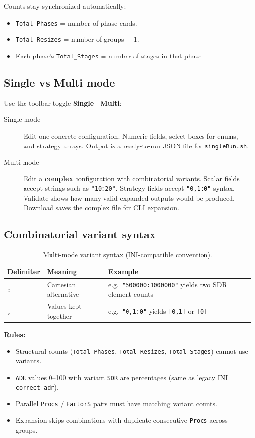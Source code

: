 Counts stay synchronized automatically:
\begin{itemize}
  \item \texttt{Total\_Phases} = number of phase cards.
  \item \texttt{Total\_Resizes} = number of groups $-$ 1.
  \item Each phase's \texttt{Total\_Stages} = number of stages in that phase.
\end{itemize}

\subsection{Single vs Multi mode}

Use the toolbar toggle \textbf{Single} | \textbf{Multi}:

\begin{description}
  \item[Single mode] Edit one concrete configuration. Numeric fields, select boxes for enums, and strategy arrays. Output is a ready-to-run JSON file for \texttt{singleRun.sh}.
  \item[Multi mode] Edit a \textbf{complex} configuration with combinatorial variants. Scalar fields accept strings such as \texttt{"10:20"}. Strategy fields accept \texttt{"0,1:0"} syntax. Validate shows how many valid expanded outputs would be produced. Download saves the complex file for CLI expansion.
\end{description}

\subsection{Combinatorial variant syntax}

\begin{table}[H]
\centering
\small
\begin{tabular}{@{}llp{6.5cm}@{}}
\toprule
\textbf{Delimiter} & \textbf{Meaning} & \textbf{Example} \\
\midrule
\texttt{:} & Cartesian alternative & e.g.\ \texttt{"500000:1000000"} yields two SDR element counts \\
\texttt{,} & Values kept together & e.g.\ \texttt{"0,1:0"} yields \texttt{[0,1]} or \texttt{[0]} \\
\bottomrule
\end{tabular}
\caption{Multi-mode variant syntax (INI-compatible convention).}
\end{table}

\textbf{Rules:}
\begin{itemize}
  \item Structural counts (\texttt{Total\_Phases}, \texttt{Total\_Resizes}, \texttt{Total\_Stages}) cannot use variants.
  \item \texttt{ADR} values 0--100 with variant \texttt{SDR} are percentages (same as legacy INI \texttt{correct\_adr}).
  \item Parallel \texttt{Procs} / \texttt{FactorS} pairs must have matching variant counts.
  \item Expansion skips combinations with duplicate consecutive \texttt{Procs} across groups.
\end{itemize}

